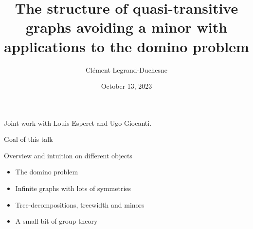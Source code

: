 \documentclass[11pt,dvipsnames,presentation,aspectratio=169]{beamer}
\begin{document}
\title{The structure of quasi-transitive graphs avoiding a minor with
  applications to the domino problem}
\author[Clément Legrand]{Clément Legrand-Duchesne}
\date{October 13, 2023}

\begin{frame}
  \titlepage

  \centering
  Joint work with Louis Esperet and Ugo Giocanti.
\end{frame}

\begin{frame}{Goal of this talk}
  \begin{exampleblock}{Overview and intuition on different objects}
    \begin{itemize}
    \item The domino problem
    \item Infinite graphs with lots of symmetries
    \item Tree-decompositions, treewidth and minors
    \item A small bit of group theory
    \end{itemize}
  \end{exampleblock}
\end{frame}
\end{document}
